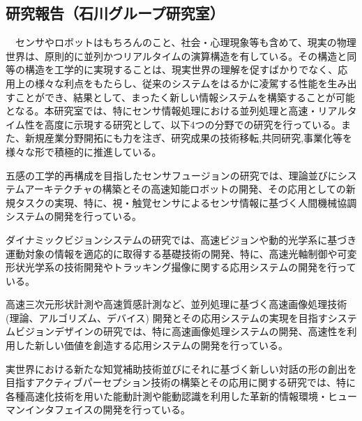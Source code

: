 \subsection{研究報告（石川グループ研究室）}

　センサやロボットはもちろんのこと、社会・心理現象等も含めて、現実の物理世界は、原則的に並列かつリアルタイムの演算構造を有している。その構造と同等の構造を工学的に実現することは、現実世界の理解を促すばかりでなく、応用上の様々な利点をもたらし、従来のシステムをはるかに凌駕する性能を生み出すことができ、結果として、まったく新しい情報システムを構築することが可能となる。本研究室では、特にセンサ情報処理における並列処理と高速・リアルタイム性を高度に示現する研究として、以下4つの分野での研究を行っている。また、新規産業分野開拓にも力を注ぎ、研究成果の技術移転,共同研究,事業化等を様々な形で積極的に推進している。

五感の工学的再構成を目指したセンサフュージョンの研究では、理論並びにシステムアーキテクチャの構築とその高速知能ロボットの開発、その応用としての新規タスクの実現、特に、視・触覚センサによるセンサ情報に基づく人間機械協調システムの開発を行っている。

ダイナミックビジョンシステムの研究では、高速ビジョンや動的光学系に基づき運動対象の情報を適応的に取得する基礎技術の開発、特に、高速光軸制御や可変形状光学系の技術開発やトラッキング撮像に関する応用システムの開発を行っている。

高速三次元形状計測や高速質感計測など、並列処理に基づく高速画像処理技術 (理論、アルゴリズム、デバイス) 開発とその応用システムの実現を目指すシステムビジョンデザインの研究では、特に高速画像処理システムの開発、高速性を利用した新しい価値を創造する応用システムの開発を行っている。

実世界における新たな知覚補助技術並びにそれに基づく新しい対話の形の創出を目指すアクティブパーセプション技術の構築とその応用に関する研究では、特に各種高速化技術を用いた能動計測や能動認識を利用した革新的情報環境・ヒューマンインタフェイスの開発を行っている。

